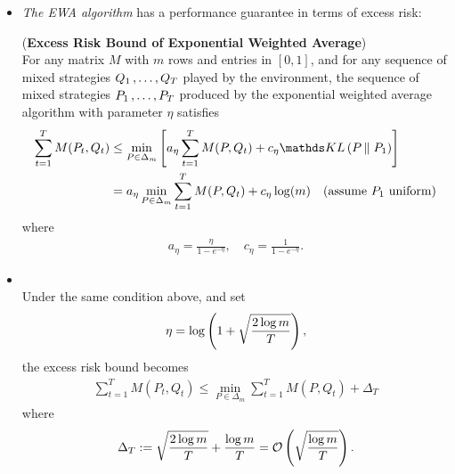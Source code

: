 \documentclass[11pt]{article}
\begin{document}
\begin{itemize}
\item \emph{The EWA algorithm} has a performance guarantee in terms of excess risk:
\begin{theorem} (\textbf{Excess Risk Bound of Exponential Weighted Average})  \citep{schapire2012boosting}\\
For any matrix $M$ with $m$ rows and entries in $[0, 1]$, and for any sequence of mixed strategies $Q_1 \,{,}\ldots{,}\, Q_T$ played by the environment, the sequence of mixed strategies $P_1 \,{,}\ldots{,}\, P_T$ produced by the exponential weighted average algorithm  with parameter $\eta$ satisfies
\begin{align}
\sum_{t=1}^{T}M(P_t, Q_t) &\le \min_{P \in \Delta_m}\brac{a_{\eta}\sum_{t=1}^{T}M(P, Q_t) + c_{\eta} \kl{P}{P_1}  } \label{ineqn: excess_risk_bound_exp_weight_avg}\\
&= a_{\eta}\min_{P \in \Delta_m}\sum_{t=1}^{T}M(P, Q_t) + c_{\eta}\log(m) \quad (\text{assume $P_1$ uniform}) \nonumber
\end{align} 
where
\begin{align*}
a_{\eta} = \frac{\eta}{1 - e^{-\eta}}, \quad c_{\eta} = \frac{1}{1 - e^{-\eta}}.
\end{align*}
\end{theorem}

\item \begin{corollary} \citep{schapire2012boosting}\\
Under the same condition above, and set 
\begin{align*}
\eta = \log\left(1 + \sqrt{\frac{2\log m}{T}}\right),
\end{align*} the excess risk bound becomes
\begin{align}
\sum_{t=1}^{T}M(P_t, Q_t) \le \min_{P \in \Delta_m}\sum_{t=1}^{T}M(P, Q_t) + \Delta_T \label{ineqn: excess_risk_bound_exp_weight_avg_delta}
\end{align} where
\begin{align*}
 \Delta_T := \sqrt{\frac{2\log m}{T}} + \frac{\log m}{T} = {\mathcal O}\left(\sqrt{\frac{\log m}{T}}\right).
\end{align*}
\end{corollary}


\end{itemize}
\end{document}
